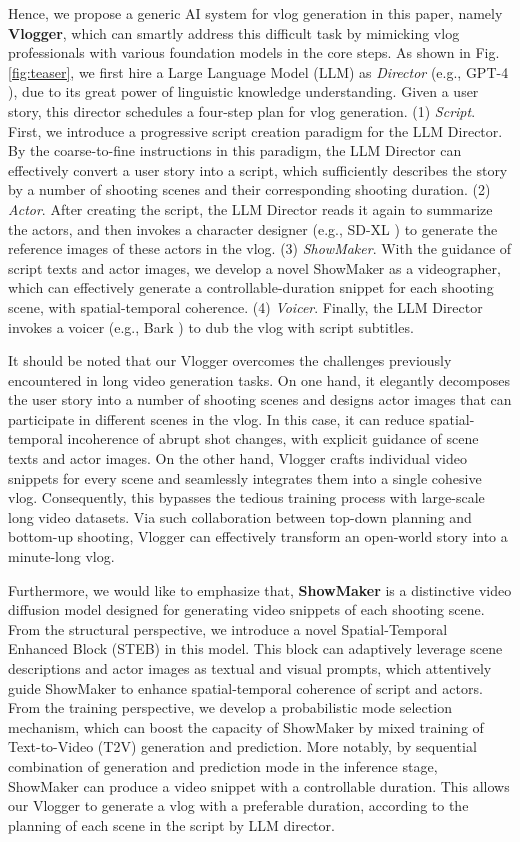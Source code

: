 Hence,
we propose a generic AI system for vlog generation in this paper,
namely \textbf{Vlogger},
which can smartly address this difficult task by mimicking vlog professionals with various foundation models in the core steps.
As shown in Fig. \ref{fig:teaser},
we first hire a Large Language Model (LLM) as \textit{Director} (e.g., GPT-4 \cite{OpenAI2023GPT4TR}),
due to its great power of linguistic knowledge understanding.
Given a user story,
this director schedules a four-step plan for vlog generation.
(1) \textit{Script}.
First,
we introduce a progressive script creation paradigm for the LLM Director.
By the coarse-to-fine instructions in this paradigm,
the LLM Director can effectively convert a user story into a script,
which sufficiently describes the story by a number of shooting scenes and their corresponding shooting duration.
(2) \textit{Actor}.
After creating the script,
the LLM Director reads it again to summarize the actors,
and then invokes a character designer (e.g., SD-XL \cite{Podell2023SDXLIL}) to generate the reference images of these actors in the vlog.
(3) \textit{ShowMaker}.
With the guidance of script texts and actor images,
we develop a novel ShowMaker as a videographer,
which can effectively generate a controllable-duration snippet for each shooting scene, with spatial-temporal coherence. 
(4) \textit{Voicer}.
Finally,
the LLM Director invokes a voicer (e.g., Bark \cite{sunoai2023bark}) to dub the vlog with script subtitles.


It should be noted that
our Vlogger overcomes the challenges previously encountered in long video generation tasks.
On one hand, 
it elegantly decomposes the user story into a number of shooting scenes
and designs actor images that can participate in different scenes in the vlog.
In this case,
it can reduce spatial-temporal incoherence of abrupt shot changes,
with explicit guidance of scene texts and actor images.
On the other hand, 
Vlogger crafts individual video snippets for every scene and seamlessly integrates them into a single cohesive vlog. 
Consequently, 
this bypasses the tedious training process with large-scale long video datasets. 
Via such collaboration between top-down planning and bottom-up shooting, 
Vlogger can effectively transform an open-world story into a minute-long vlog.


Furthermore, 
we would like to emphasize that,
\textbf{ShowMaker} is a distinctive video diffusion model designed for generating video snippets of each shooting scene.
From the structural perspective,
we introduce a novel Spatial-Temporal Enhanced Block (STEB) in this model.
This block can adaptively leverage scene descriptions and actor images as textual and visual prompts,
which attentively guide ShowMaker to enhance spatial-temporal coherence of script and actors.
From the training perspective,
we develop a probabilistic mode selection mechanism,
which can boost the capacity of ShowMaker by mixed training of Text-to-Video (T2V) generation and prediction.
More notably,
by sequential combination of generation and prediction mode in the inference stage,
ShowMaker can produce a video snippet with a controllable duration.
This allows our Vlogger to generate a vlog with a preferable duration,
according to the planning of each scene in the script by LLM director.

